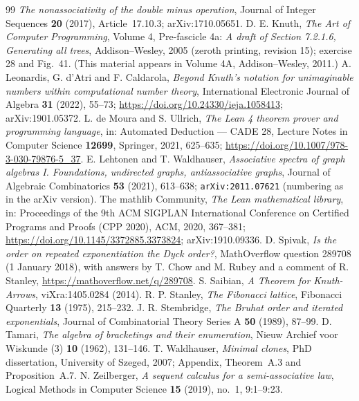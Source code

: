 \documentclass[11pt,a4paper]{article}
\theoremstyle{plain}
\theoremstyle{definition}
\begin{document}
\begin{thebibliography}{99}
  \emph{The nonassociativity of the double minus operation},
  Journal of Integer Sequences \textbf{20} (2017), Article~17.10.3; arXiv:1710.05651.
 D. E. Knuth,
  \emph{The Art of Computer Programming}, Volume 4, Pre-fascicle 4a: \emph{A draft of
  Section 7.2.1.6, Generating all trees}, Addison--Wesley, 2005 (zeroth printing,
  revision 15); exercise 28 and Fig.~41. (This material appears in Volume 4A,
  Addison--Wesley, 2011.)
 A. Leonardis, G. d'Atri and F. Caldarola,
  \emph{Beyond Knuth's notation for unimaginable numbers within computational number
  theory}, International Electronic Journal of Algebra \textbf{31} (2022), 55--73;
  \url{https://doi.org/10.24330/ieja.1058413}; arXiv:1901.05372.
 L. de Moura and S. Ullrich,
  \emph{The Lean 4 theorem prover and programming language}, in: Automated Deduction ---
  CADE 28, Lecture Notes in Computer Science \textbf{12699}, Springer, 2021, 625--635;
  \url{https://doi.org/10.1007/978-3-030-79876-5_37}.
 E. Lehtonen and T. Waldhauser,
  \emph{Associative spectra of graph algebras I. Foundations, undirected graphs,
  antiassociative graphs}, Journal of Algebraic Combinatorics \textbf{53} (2021),
  613--638; \texttt{arXiv:2011.07621} (numbering as in the arXiv version).
 The mathlib Community,
  \emph{The Lean mathematical library}, in: Proceedings of the 9th ACM SIGPLAN
  International Conference on Certified Programs and Proofs (CPP 2020), ACM, 2020,
  367--381; \url{https://doi.org/10.1145/3372885.3373824}; arXiv:1910.09336.
 D. Spivak, \emph{Is the order on repeated exponentiation the Dyck order?},
  MathOverflow question 289708 (1 January 2018), with answers by T. Chow and M. Rubey
  and a comment of R. Stanley, \url{https://mathoverflow.net/q/289708}.
 S. Saibian,
  \emph{A Theorem for Knuth-Arrows}, viXra:1405.0284 (2014).
 R. P. Stanley,
  \emph{The Fibonacci lattice},
  Fibonacci Quarterly \textbf{13} (1975), 215--232.
 J. R. Stembridge,
  \emph{The Bruhat order and iterated exponentials},
  Journal of Combinatorial Theory Series A \textbf{50} (1989), 87--99.
 D. Tamari,
  \emph{The algebra of bracketings and their enumeration},
  Nieuw Archief voor Wiskunde (3) \textbf{10} (1962), 131--146.
 T. Waldhauser,
  \emph{Minimal clones}, PhD dissertation, University of Szeged, 2007;
  Appendix, Theorem~A.3 and Proposition~A.7.
 N. Zeilberger,
  \emph{A sequent calculus for a semi-associative law},
  Logical Methods in Computer Science \textbf{15} (2019), no.~1, 9:1--9:23.
\end{thebibliography}
\end{document}
